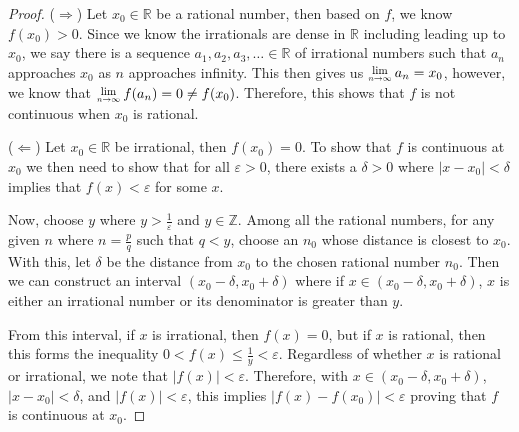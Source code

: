 \documentclass[11pt]{article}
\newcommand{\R}{\mathbb{R}}
\newcommand{\Z}{\mathbb{Z}}
\newcommand{\Lim}[1]{\raisebox{0.5ex}{\scalebox{0.8}{$\displaystyle \lim_{#1}\;$}}}
\begin{document}
\begin{proof}
	($\Longrightarrow$) Let $x_0 \in \R$ be a rational number, then based on $f$, we know $f(x_0) > 0$. Since we know the irrationals are dense in $\R$ including leading up to $x_0$, we say there is a sequence $a_1, a_2, a_3, \ldots \in \R$ of irrational numbers such that $a_n$ approaches $x_0$ as $n$ approaches infinity. This then gives us $\Lim{n \rightarrow \infty} a_n = x_0$, however, we know that $\Lim{n \rightarrow \infty}f(a_n) = 0 \not = f(x_0)$. Therefore, this shows that $f$ is not continuous when $x_0$ is rational.

	($\Longleftarrow$) Let $x_0 \in \R$ be irrational, then $f(x_0)=0$. To show that $f$ is continuous at $x_0$ we then need to show that for all $\varepsilon > 0$, there exists a $\delta > 0$ where $|x-x_0| < \delta$ implies that $f(x) < \varepsilon$ for some $x$. 

	Now, choose $y$ where $y > \frac{1}{\varepsilon}$ and $y \in \Z$. Among all the rational numbers, for any given $n$ where $n=\frac{p}{q}$ such that $q < y$, choose an $n_0$ whose distance is closest to $x_0$. With this, let $\delta$ be the distance from $x_0$ to the chosen rational number $n_0$. Then we can construct an interval $(x_0 - \delta, x_0 + \delta)$ where if $x \in (x_0 - \delta, x_0 + \delta)$, $x$ is either an irrational number or its denominator is greater than $y$. 

	From this interval, if $x$ is irrational, then $f(x)=0$, but if $x$ is rational, then this forms the inequality $0 < f(x) \le \frac{1}{y} < \varepsilon$. Regardless of whether $x$ is rational or irrational, we note that $|f(x)| < \varepsilon$. Therefore, with $x \in (x_0 - \delta, x_0 + \delta)$, $|x-x_0|< \delta$, and $|f(x)| < \varepsilon$, this implies $|f(x) - f(x_0)| < \varepsilon$ proving that $f$ is continuous at $x_0$.
\end{proof}







	
\end{document}
